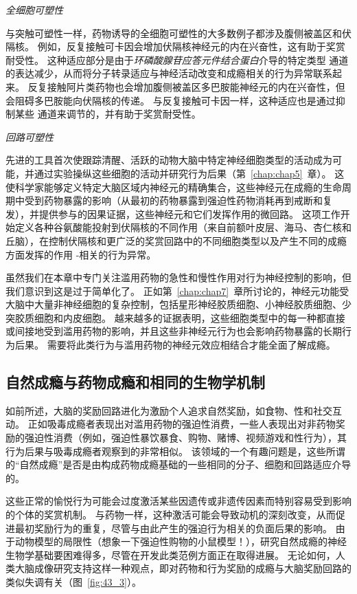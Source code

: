 \textit{全细胞可塑性}

与突触可塑性一样，药物诱导的全细胞可塑性的大多数例子都涉及腹侧被盖区和伏隔核。
例如，反复接触可卡因会增加伏隔核神经元的内在兴奋性，这有助于奖赏耐受性。
这种适应部分是由于\textit{环磷酸腺苷应答元件结合蛋白}介导的特定类型  通道的表达减少，从而将分子转录适应与神经活动改变和成瘾相关的行为异常联系起来。
反复接触阿片类药物也会增加腹侧被盖区多巴胺能神经元的内在兴奋性，但会阻碍多巴胺能向伏隔核的传递。
与反复接触可卡因一样，这种适应也是通过抑制某些  通道来调节的，并有助于奖赏耐受性。


\textit{回路可塑性}

先进的工具首次使跟踪清醒、活跃的动物大脑中特定神经细胞类型的活动成为可能，并通过实验操纵这些细胞的活动并研究行为后果（第~\ref{chap:chap5}~章）。
这使科学家能够定义特定大脑区域内神经元的精确集合，这些神经元在成瘾的生命周期中受到药物暴露的影响（从最初的药物暴露到强迫性药物消耗再到戒断和复发），并提供参与的因果证据，这些神经元和它们发挥作用的微回路。
这项工作开始定义各种谷氨酸能投射到伏隔核的不同作用（来自前额叶皮层、海马、杏仁核和丘脑），在控制伏隔核和更广泛的奖赏回路中的不同细胞类型以及产生不同的成瘾方面发挥的作用 -相关的行为异常。


虽然我们在本章中专门关注滥用药物的急性和慢性作用对行为神经控制的影响，但我们意识到这是过于简单化了。
正如第~\ref{chap:chap7}~章所讨论的，神经元功能受大脑中大量非神经细胞的复杂控制，包括星形神经胶质细胞、小神经胶质细胞、少突胶质细胞和内皮细胞。
越来越多的证据表明，这些细胞类型中的每一种都直接或间接地受到滥用药物的影响，并且这些非神经元行为也会影响药物暴露的长期行为后果。
需要将此类行为与滥用药物的神经元效应相结合才能全面了解成瘾。



\subsection{自然成瘾与药物成瘾和相同的生物学机制}

如前所述，大脑的奖励回路进化为激励个人追求自然奖励，如食物、性和社交互动。
正如吸毒成瘾者表现出对滥用药物的强迫性消费，一些人表现出对非药物奖励的强迫性消费（例如，强迫性暴饮暴食、购物、赌博、视频游戏和性行为），其行为后果与吸毒成瘾者观察到的非常相似。
该领域的一个有趣问题是，这些所谓的“自然成瘾”是否是由构成药物成瘾基础的一些相同的分子、细胞和回路适应介导的。


这些正常的愉悦行为可能会过度激活某些因遗传或非遗传因素而特别容易受到影响的个体的奖赏机制。
与药物一样，这种激活可能会导致动机的深刻改变，从而促进最初奖励行为的重复，尽管与由此产生的强迫行为相关的负面后果的影响。
由于动物模型的局限性（想象一下强迫性购物的小鼠模型！），研究自然成瘾的神经生物学基础要困难得多，尽管在开发此类范例方面正在取得进展。
无论如何，人类大脑成像研究支持这样一种观点，即对药物和行为奖励的成瘾与大脑奖励回路的类似失调有关（图~\ref{fig:43_3}）。



